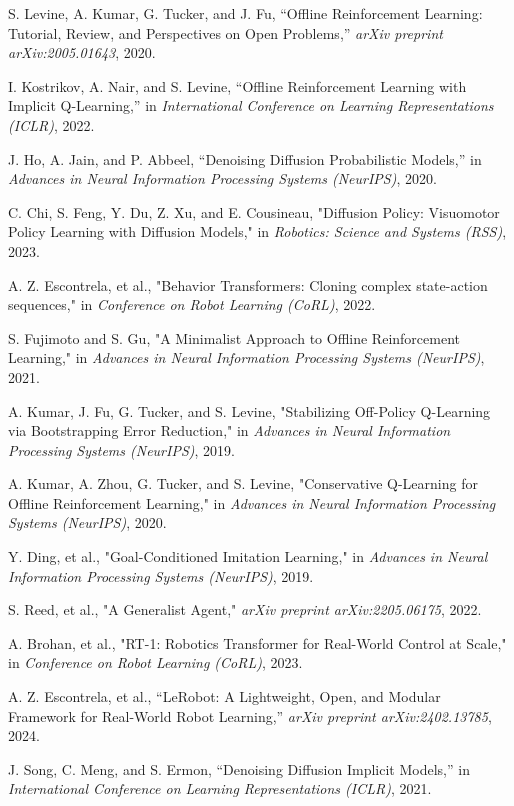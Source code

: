 \documentclass[conference]{IEEEtran}
\begin{document}
\begin{thebibliography}{1}

S. Levine, A. Kumar, G. Tucker, and J. Fu, ``Offline Reinforcement Learning: Tutorial, Review, and Perspectives on Open Problems,'' \textit{arXiv preprint arXiv:2005.01643}, 2020.

I. Kostrikov, A. Nair, and S. Levine, ``Offline Reinforcement Learning with Implicit Q-Learning,'' in \textit{International Conference on Learning Representations (ICLR)}, 2022.

J. Ho, A. Jain, and P. Abbeel, ``Denoising Diffusion Probabilistic Models,'' in \textit{Advances in Neural Information Processing Systems (NeurIPS)}, 2020.

C. Chi, S. Feng, Y. Du, Z. Xu, and E. Cousineau, "Diffusion Policy: Visuomotor Policy Learning with Diffusion Models," in \textit{Robotics: Science and Systems (RSS)}, 2023.

A. Z. Escontrela, et al., "Behavior Transformers: Cloning complex state-action sequences," in \textit{Conference on Robot Learning (CoRL)}, 2022.

S. Fujimoto and S. Gu, "A Minimalist Approach to Offline Reinforcement Learning," in \textit{Advances in Neural Information Processing Systems (NeurIPS)}, 2021.

A. Kumar, J. Fu, G. Tucker, and S. Levine, "Stabilizing Off-Policy Q-Learning via Bootstrapping Error Reduction," in \textit{Advances in Neural Information Processing Systems (NeurIPS)}, 2019.

A. Kumar, A. Zhou, G. Tucker, and S. Levine, "Conservative Q-Learning for Offline Reinforcement Learning," in \textit{Advances in Neural Information Processing Systems (NeurIPS)}, 2020.

Y. Ding, et al., "Goal-Conditioned Imitation Learning," in \textit{Advances in Neural Information Processing Systems (NeurIPS)}, 2019.

S. Reed, et al., "A Generalist Agent," \textit{arXiv preprint arXiv:2205.06175}, 2022.

A. Brohan, et al., "RT-1: Robotics Transformer for Real-World Control at Scale," in \textit{Conference on Robot Learning (CoRL)}, 2023.

A. Z. Escontrela, et al., ``LeRobot: A Lightweight, Open, and Modular Framework for Real-World Robot Learning,'' \textit{arXiv preprint arXiv:2402.13785}, 2024.

J. Song, C. Meng, and S. Ermon, ``Denoising Diffusion Implicit Models,'' in \textit{International Conference on Learning Representations (ICLR)}, 2021.

\end{thebibliography}
\end{document}
